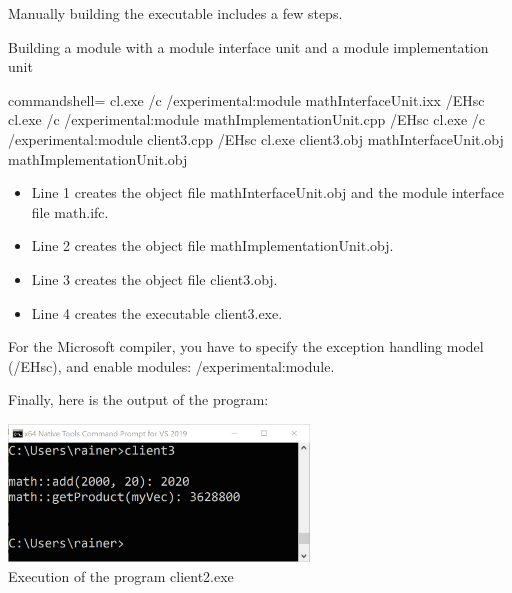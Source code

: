 \begin{tcolorbox}[colback=blue!5!white,colframe=blue!75!black,title=Building the Executable with the Microsoft Compiler]
	
Manually building the executable includes a few steps.

\noindent
Building a module with a module interface unit and a module implementation unit
\begin{tcblisting}{commandshell={}}
cl.exe /c /experimental:module mathInterfaceUnit.ixx /EHsc
cl.exe /c /experimental:module mathImplementationUnit.cpp /EHsc
cl.exe /c /experimental:module client3.cpp /EHsc
cl.exe client3.obj mathInterfaceUnit.obj mathImplementationUnit.obj
\end{tcblisting}

\begin{itemize}
\item 
Line 1 creates the object file mathInterfaceUnit.obj and the module interface file math.ifc.

\item 
Line 2 creates the object file mathImplementationUnit.obj.

\item 
Line 3 creates the object file client3.obj.

\item 
Line 4 creates the executable client3.exe.
\end{itemize}

For the Microsoft compiler, you have to specify the exception handling model (/EHsc), and enable modules: /experimental:module.

Finally, here is the output of the program:

\begin{center}
\includegraphics[width=0.6\textwidth]{content/3/chapter4/images/20.png}\\
Execution of the program client2.exe
\end{center}
\end{tcolorbox}


